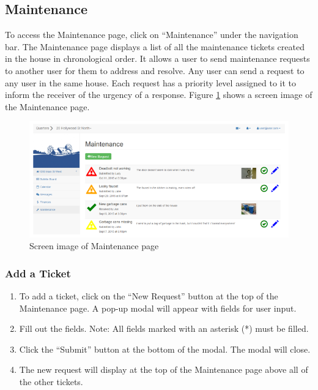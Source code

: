 \documentclass[12pt]{article}
\begin{document}
    \subsection{Maintenance}
    To access the Maintenance page, click on ``Maintenance'' under the navigation bar. The Maintenance page displays a list of all the maintenance tickets created in the house in chronological order. It  allows a user to send maintenance requests to another user for them to address and resolve. Any user can send a request to any user in the same house. Each request has a priority level assigned to it to inform the receiver of the urgency of a response. Figure \ref{fig:maintenance} shows a screen image of the Maintenance page.

    \begin{figure}
        \centering
        \includegraphics[width=\textwidth]{maintenance}
        \caption{Screen image of Maintenance page}
        \label{fig:maintenance}
    \end{figure}

    \subsubsection{Add a Ticket}
    \begin{enumerate}
        \item To add a ticket, click on the ``New Request'' button at the top of the Maintenance page. A pop-up modal will appear with fields for user input.
        \item Fill out the fields. Note: All fields marked with an asterisk (*) must be filled.
        \item Click the ``Submit'' button at the bottom of the modal. The modal will close.
        \item The new request will display at the top of the Maintenance page above all of the other tickets.
    \end{enumerate}
\end{document}
